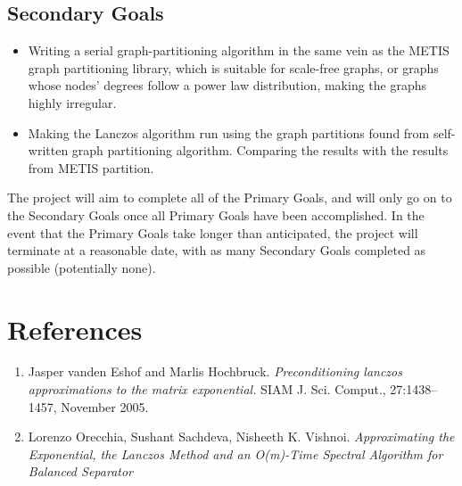 \documentclass[a4paper, fleqn]{article}
\begin{document}
\subsection*{Secondary Goals}%
\label{sub:subsection_name}


\begin{itemize}
        \item Writing a serial graph-partitioning algorithm in the same vein as the METIS graph partitioning library, which is suitable for scale-free graphs, or graphs whose nodes' degrees follow a power law distribution, making the graphs highly irregular.
        \item Making the Lanczos algorithm run using the graph partitions found from self-written graph partitioning algorithm. Comparing the results with the results from METIS partition.
\end{itemize}

The project will aim to complete all of the Primary Goals, and will only go on to the Secondary Goals once all Primary Goals have been accomplished. In the event that the Primary Goals take longer than anticipated, the project will terminate at a reasonable date, with as many Secondary Goals completed as possible (potentially none).
\section*{References}%
\label{sec:references}
\begin{enumerate}
        \item Jasper vanden Eshof and Marlis Hochbruck. \textit{Preconditioning lanczos approximations to the matrix exponential.} SIAM J. Sci. Comput., 27:1438–1457, November 2005.
        \item Lorenzo Orecchia, Sushant Sachdeva, Nisheeth K. Vishnoi. \textit{Approximating the Exponential, the Lanczos Method and an O(m)-Time Spectral Algorithm for Balanced Separator}
\end{enumerate}
\end{document}
